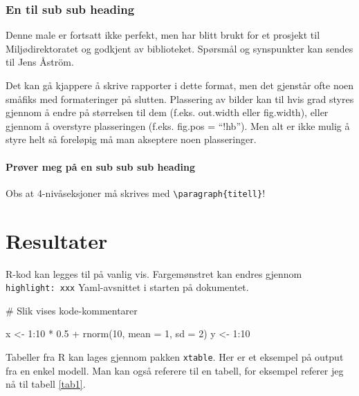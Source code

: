 \documentclass[11pt, a4paper]{article}
\newenvironment{Shaded}{\begin{snugshade}}{\end{snugshade}}
\newcommand{\AttributeTok}[1]{\textcolor[rgb]{0.40,0.45,0.13}{#1}}
\newcommand{\CommentTok}[1]{\textcolor[rgb]{0.37,0.37,0.37}{#1}}
\newcommand{\DecValTok}[1]{\textcolor[rgb]{0.68,0.00,0.00}{#1}}
\newcommand{\FloatTok}[1]{\textcolor[rgb]{0.68,0.00,0.00}{#1}}
\newcommand{\FunctionTok}[1]{\textcolor[rgb]{0.28,0.35,0.67}{#1}}
\newcommand{\NormalTok}[1]{\textcolor[rgb]{0.00,0.23,0.31}{#1}}
\newcommand{\OtherTok}[1]{\textcolor[rgb]{0.00,0.23,0.31}{#1}}
\newcommand{\SpecialCharTok}[1]{\textcolor[rgb]{0.37,0.37,0.37}{#1}}
\begin{document}
\hypertarget{en-til-sub-sub-heading}{%
\subsubsection{En til sub sub heading}\label{en-til-sub-sub-heading}}

Denne male er fortsatt ikke perfekt, men har blitt brukt for et prosjekt
til Miljødirektoratet og godkjent av biblioteket. Spørsmål og
synspunkter kan sendes til Jens Åström.

Det kan gå kjappere å skrive rapporter i dette format, men det gjenstår
ofte noen småfiks med formateringer på slutten. Plassering av bilder kan
til hvis grad styres gjennom å endre på størrelsen til dem (f.eks.
out.width eller fig.width), eller gjennom å overstyre plasseringen
(f.eks. fig.pos = ``!hb''). Men alt er ikke mulig å styre helt så
foreløpig må man akseptere noen plasseringer.

\paragraph{Prøver meg på en sub sub sub heading}

Obs at 4-nivåseksjoner må skrives med
\texttt{\textbackslash{}paragraph\{titell\}}!

\newpage

\hypertarget{res}{%
\section{Resultater}\label{res}}

R-kod kan legges til på vanlig vis. Fargemønstret kan endres gjennom
\texttt{highlight:\ xxx} Yaml-avsnittet i starten på dokumentet.

\begin{Shaded}
\begin{Highlighting}[]
\CommentTok{\# Slik vises kode{-}kommentarer}

\NormalTok{x }\OtherTok{\textless{}{-}} \DecValTok{1}\SpecialCharTok{:}\DecValTok{10} \SpecialCharTok{*} \FloatTok{0.5} \SpecialCharTok{+} \FunctionTok{rnorm}\NormalTok{(}\DecValTok{10}\NormalTok{, }\AttributeTok{mean =} \DecValTok{1}\NormalTok{, }\AttributeTok{sd =} \DecValTok{2}\NormalTok{)}
\NormalTok{y }\OtherTok{\textless{}{-}} \DecValTok{1}\SpecialCharTok{:}\DecValTok{10}
\end{Highlighting}
\end{Shaded}

Tabeller fra R kan lages gjennom pakken \texttt{xtable}. Her er et
eksempel på output fra en enkel modell. Man kan også referere til en
tabell, for eksempel referer jeg nå til tabell \ref{tab1}.
\end{document}
